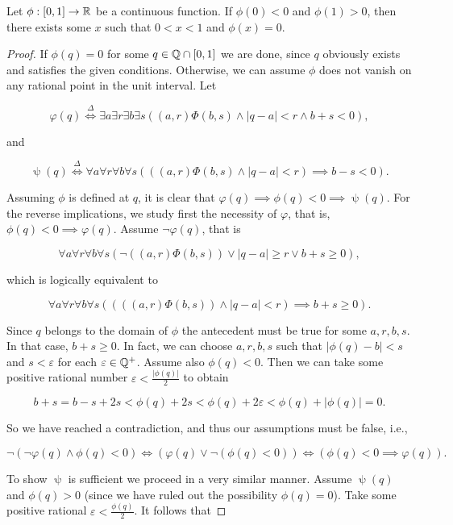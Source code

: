 \documentclass[../main.tex]{memoir}
\begin{document}
\begin{theorem}
  Let $\phi: [0, 1] \to \mathbb{R}$ be a continuous function. If $\phi(0) < 0$ and $\phi(1) > 0$, then there exists some $x$ such that $0 < x < 1$ and $\phi(x) = 0$.
\end{theorem}
\begin{proof}
  If $\phi(q) = 0$ for some $q \in \mathbb{Q} \cap [0, 1]$ we are done, since $q$ obviously exists and satisfies the given conditions. Otherwise, we can assume $\phi$ does not vanish on any rational point in the unit interval. Let

  \[ \varphi(q) \overset{\Delta}{\iff} \exists a \exists r \exists b \exists s ((a, r)\Phi(b, s) \land |q - a| < r \land b + s < 0), \]

  and

  \[ \uppsi(q) \overset{\Delta}{\iff} \forall a \forall r \forall b \forall s (((a, r)\Phi(b, s) \land |q - a| < r) \implies b - s < 0). \]

  Assuming $\phi$ is defined at $q$, it is clear that $\varphi(q) \implies \phi(q) < 0 \implies \uppsi(q)$. For the reverse implications, we study first the necessity of $\varphi$, that is, $\phi(q) < 0 \implies \varphi(q)$. Assume $\neg \varphi(q)$, that is

  \[ \forall a \forall r \forall b \forall s (\neg((a, r)\Phi(b, s)) \lor |q - a| \ge r \lor b + s \ge 0), \]

  which is logically equivalent to

  \[ \forall a \forall r \forall b \forall s ((((a, r)\Phi(b, s)) \land |q - a| < r) \implies b + s \ge 0). \]

  Since $q$ belongs to the domain of $\phi$ the antecedent must be true for some $a, r, b, s$. In that case, $b + s \ge 0$. In fact, we can choose $a, r, b, s$ such that $|\phi(q) - b| < s$ and $s < \varepsilon$ for each $\varepsilon \in \mathbb{Q}^+$. Assume also $\phi(q) < 0$. Then we can take some positive rational number $\varepsilon < \frac{|\phi(q)|}{2}$ to obtain

  \[ b + s = b - s + 2s < \phi(q) + 2s < \phi(q) + 2\varepsilon < \phi(q) + |\phi(q)| = 0. \]

  So we have reached a contradiction, and thus our assumptions must be false, i.e.,

  \[ \neg(\neg\varphi(q) \land \phi(q) < 0) \iff (\varphi(q) \lor \neg(\phi(q) < 0)) \iff (\phi(q) < 0 \implies \varphi(q)). \]

  To show $\uppsi$ is sufficient we proceed in a very similar manner. Assume $\uppsi(q)$ and $\phi(q) > 0$ (since we have ruled out the possibility $\phi(q) = 0$). Take some positive rational $\varepsilon < \frac{\phi(q)}{2}$. It follows that


\end{proof}
\end{document}
